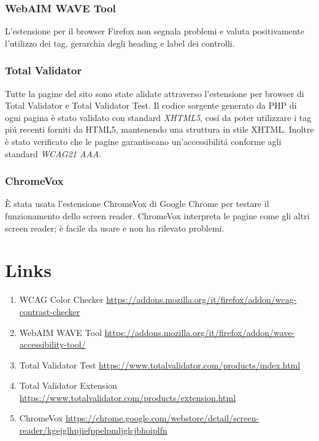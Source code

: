 \subsubsection{WebAIM WAVE Tool}
L'estensione per il browser Firefox non segnala problemi e valuta positivamente l'utilizzo dei tag, gerarchia degli heading e label dei controlli.

\subsubsection{Total Validator}
Tutte la pagine del sito sono state alidate attraverso l'estensione per browser di Total Validator e Total Validator Test. Il codice sorgente generato da PHP di ogni pagina è stato validato con standard \textit{XHTML5}, cosí da poter utilizzare i tag piú recenti forniti da HTML5, mantenendo una struttura in stile XHTML. Inoltre è stato verificato che le pagine garantiscano un'accessibilitá conforme agli standard \textit{WCAG21 AAA}.
\subsubsection{ChromeVox}
È stata usata l'estensione ChromeVox di Google Chrome per testare il funzionamento dello screen reader. ChromeVox interpreta le pagine come gli altri screen reader; è facile da usare e non ha rilevato problemi.


\vfill
\section*{Links}
\begin{enumerate}
	\item WCAG Color Checker \url{https://addons.mozilla.org/it/firefox/addon/wcag-contrast-checker} 
    \item WebAIM WAVE Tool \url{https://addons.mozilla.org/it/firefox/addon/wave-accessibility-tool/} 
    \item Total Validator Test \url{https://www.totalvalidator.com/products/index.html}
    \item Total Validator Extension \url{https://www.totalvalidator.com/products/extension.html}
    \item ChromeVox \url{https://chrome.google.com/webstore/detail/screen-reader/kgejglhpjiefppelpmljglcjbhoiplfn}
\end{enumerate}
    